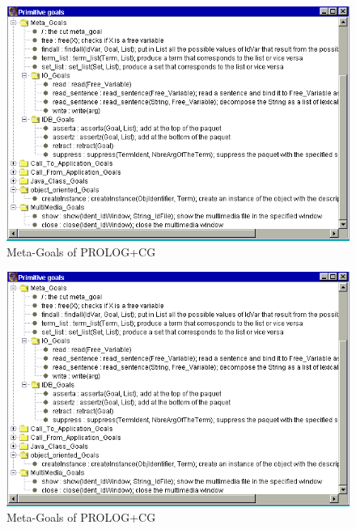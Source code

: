 \documentclass{book}
\begin{document}
 
\begin{latexonly}

\begin{figure}
\begin{center}
\includegraphics[scale=0.4]{EnvPrimHierMeta.png}
\end{center}
\caption{\label{EnvPrimHierMeta}Meta-Goals of PROLOG+CG}
\end{figure}

\end{latexonly}

\begin{htmlonly}

\begin{figure}
\begin{center}
\includegraphics{EnvPrimHierMeta.png}
\end{center}
\caption{\label{EnvPrimHierMeta}Meta-Goals of PROLOG+CG}
\end{figure}

\end{htmlonly}
\end{document}

